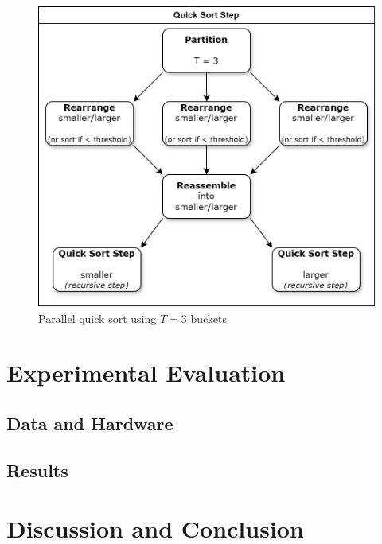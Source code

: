 \documentclass[twocolumn]{article}
\begin{document}
\begin{figure}[h]
    \includegraphics[scale=0.175]{./figures/parallel_quick_sort.drawio.png}
    \centering
    \caption{Parallel quick sort using $T=3$ buckets}
    \end{figure}

\section{Experimental Evaluation}


\subsection{Data and Hardware}%
\label{sub:Data and Hardware}

\subsection{Results}%


\section{Discussion and Conclusion}
\end{document}
